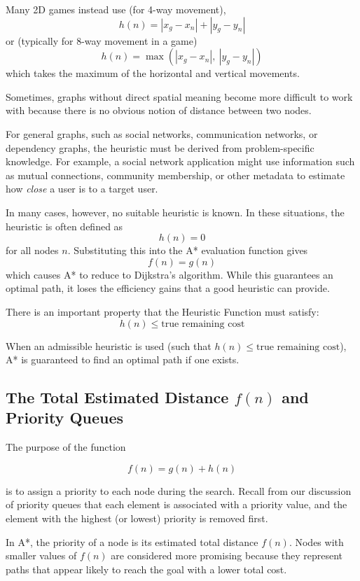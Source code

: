 Many 2D games instead use  (for 4-way movement),
$$h(n) = |x_g-x_n| + |y_g-y_n|$$
or  (typically for 8-way movement in a game)
$$h(n) = \max(|x_g - x_n|,\ |y_g - y_n|)$$
which takes the maximum of the horizontal and vertical movements.

Sometimes, graphs without direct spatial meaning become more difficult to work with because there is no obvious notion of distance between two nodes.

For general graphs, such as social networks, communication networks, or dependency graphs, the heuristic must be derived from problem-specific knowledge. For example, a social network application might use information such as mutual connections, community membership, or other metadata to estimate how \textit{close} a user is to a target user.

In many cases, however, no suitable heuristic is known. In these situations, the heuristic is often defined as
$$h(n) = 0$$
for all nodes $n$. Substituting this into the A* evaluation function gives
$$f(n) = g(n)$$
which causes A* to reduce to Dijkstra's algorithm. While this guarantees an optimal path, it loses the efficiency gains that a good heuristic can provide.

There is an important property that the Heuristic Function must satisfy:
$$h(n) \leq \text{true remaining cost}$$

When an admissible heuristic is used (such that $h(n) \leq \text{true remaining cost}$), A* is guaranteed to find an optimal path if one exists.

\subsection{The Total Estimated Distance $f(n)$ and Priority Queues}

The purpose of the function

\[
	f(n) = g(n) + h(n)
\]

is to assign a priority to each node during the search. Recall from our discussion of priority queues that each element is associated with a priority value, and the element with the highest (or lowest) priority is removed first.

In A*, the priority of a node is its estimated total distance $f(n)$. Nodes with smaller values of $f(n)$ are considered more promising because they represent paths that appear likely to reach the goal with a lower total cost.

